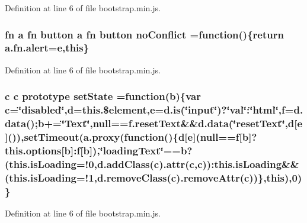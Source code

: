 Definition at line 6 of file bootstrap.\+min.\+js.

\hypertarget{a00029_ac26971afe341e4079ee34fceab395fc2}{}
\subsubsection[{no\+Conflict}]{ {\bf fn} {\bf a} {\bf fn} {\bf button} {\bf a} {\bf fn} {\bf button} no\+Conflict =function()\{return {\bf a.\+fn.\+alert}={\bf e},this\}}\label{a00029_ac26971afe341e4079ee34fceab395fc2}


Definition at line 6 of file bootstrap.\+min.\+js.

\hypertarget{a00029_a14f119ea3b5abc5536d590dfe1793c6e}{}
\subsubsection[{set\+State}]{ {\bf c} {\bf c} prototype set\+State =function({\bf b})\{var {\bf c}=\char`\"{}disabled\char`\"{},d=this.\$element,{\bf e}=d.\+is(\char`\"{}input\char`\"{})?\char`\"{}val\char`\"{}\+:\char`\"{}html\char`\"{},f=d.\+data();{\bf b}+=\char`\"{}Text\char`\"{},null==f.\+reset\+Text\&\&d.\+data(\char`\"{}reset\+Text\char`\"{},d\mbox{[}{\bf e}\mbox{]}()),set\+Timeout(a.\+proxy(function()\{{\bf d}\mbox{[}{\bf e}\mbox{]}(null==f\mbox{[}{\bf b}\mbox{]}?this.\+options\mbox{[}{\bf b}\mbox{]}\+:f\mbox{[}{\bf b}\mbox{]}),\char`\"{}loading\+Text\char`\"{}==b?(this.\+is\+Loading=!0,d.\+add\+Class({\bf c}).attr({\bf c},{\bf c}))\+:this.\+is\+Loading\&\&(this.\+is\+Loading=!1,d.\+remove\+Class({\bf c}).remove\+Attr({\bf c}))\},this),0)\}}\label{a00029_a14f119ea3b5abc5536d590dfe1793c6e}


Definition at line 6 of file bootstrap.\+min.\+js.

\hypertarget{a00029_aa8e797a9bda5e7e313be3518054164a3}{}
